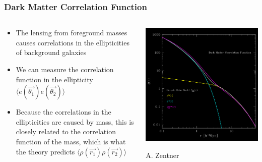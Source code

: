 \documentclass{beamer}
\begin{document}
\frame
{

    \frametitle{Dark Matter Correlation Function}


    \begin{columns}
        \begin{column}{0.5\textwidth}
            \begin{itemize}

                \item The lensing from foreground masses
                    causes correlations in the ellipticities of background
                    galaxies

                \item We can measure the correlation function in the
                    ellipticity {\color{gold} $\langle e(\vec{\theta_1})
                    e(\vec{\theta_2}) \rangle$ }

                \item Because the correlations in the ellipticities are caused
                    by mass, this is closely related to the correlation
                    function of the mass, which is what the theory predicts
                    {\color{gold} $\langle \rho(\vec{r_1}) \rho(\vec{r_2})
                    \rangle$ }

            \end{itemize}

        \end{column}
        \begin{column}{0.5\textwidth}
            \begin{center}
                \includegraphics[width=\textwidth]{zentner-halo-model-inv.png}
            \end{center}
            {\tiny A. Zentner}
        \end{column}

    \end{columns}


}
\end{document}
